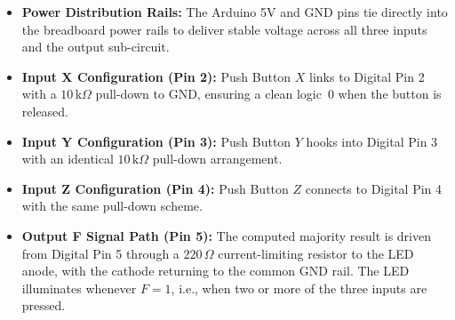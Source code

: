 \documentclass[12pt, a4paper]{article}
\begin{document}
\begin{itemize}
  \item \textbf{Power Distribution Rails:} The Arduino 5V and GND pins
        tie directly into the breadboard power rails to deliver stable
        voltage across all three inputs and the output sub-circuit.
  \item \textbf{Input X Configuration (Pin 2):} Push Button $X$ links to
        Digital Pin 2 with a $10\,\text{k}\Omega$ pull-down to GND,
        ensuring a clean logic~0 when the button is released.
  \item \textbf{Input Y Configuration (Pin 3):} Push Button $Y$ hooks
        into Digital Pin 3 with an identical $10\,\text{k}\Omega$
        pull-down arrangement.
  \item \textbf{Input Z Configuration (Pin 4):} Push Button $Z$ connects
        to Digital Pin 4 with the same pull-down scheme.
  \item \textbf{Output F Signal Path (Pin 5):} The computed majority
        result is driven from Digital Pin 5 through a $220\,\Omega$
        current-limiting resistor to the LED anode, with the cathode
        returning to the common GND rail. The LED illuminates whenever
        $F = 1$, i.e., when two or more of the three inputs are pressed.
\end{itemize}
\end{document}
